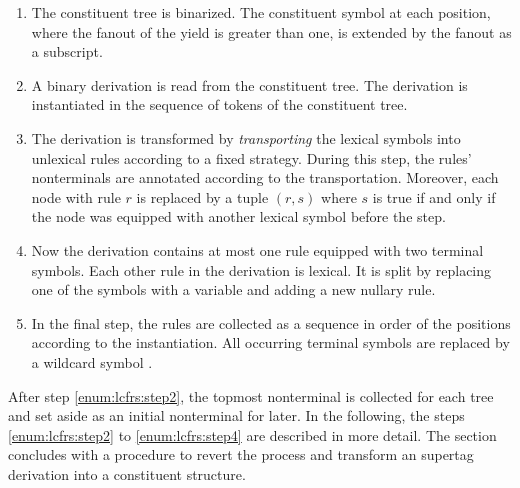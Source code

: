 \documentclass[../../document.tex]{subfiles}
\begin{document}
    \begin{enumerate}
        \item
            The constituent tree is binarized.
            The constituent symbol at each position, where the fanout of the yield is greater than one, is extended by the fanout as a subscript.
        \item\label{enum:lcfrs:step2}
            A binary  derivation is read from the constituent tree.
            The derivation is instantiated in the sequence of tokens of the constituent tree.
        \item\label{enum:lcfrs:step3}
            The derivation is transformed by \emph{transporting} the lexical symbols into unlexical rules according to a fixed strategy.
            During this step, the rules' nonterminals are annotated according to the transportation.
            Moreover, each node with rule \(r\) is replaced by a tuple \((r, s)\) where \(s\) is true if and only if the node was equipped with another lexical symbol before the step.
        \item\label{enum:lcfrs:step4}
            Now the derivation contains at most one rule equipped with two terminal symbols. Each other rule in the derivation is lexical.
            It is split by replacing one of the symbols with a variable and adding a new nullary rule.
        \item
            In the final step, the rules are collected as a sequence in order of the positions according to the instantiation.
            All occurring terminal symbols are replaced by a wildcard symbol \tn{*}.
    \end{enumerate}
    After step \ref{enum:lcfrs:step2}, the topmost  nonterminal is collected for each tree and set aside as an initial nonterminal for later.
    In the following, the steps \ref{enum:lcfrs:step2} to \ref{enum:lcfrs:step4} are described in more detail.
    The section concludes with a procedure to revert the process and transform an  supertag derivation into a constituent structure.
\end{document}
